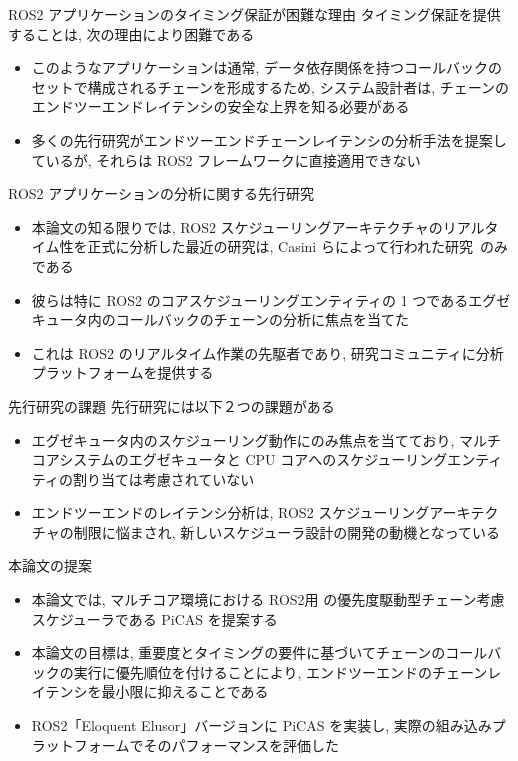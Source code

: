\begin{frame}{ROS2 アプリケーションのタイミング保証が困難な理由}
    タイミング保証を提供することは, 次の理由により困難である
    \begin{itemize}
        \item このようなアプリケーションは通常, データ依存関係を持つコールバックのセットで構成されるチェーンを形成するため, システム設計者は, チェーンのエンドツーエンドレイテンシの安全な上界を知る必要がある
        \item 多くの先行研究がエンドツーエンドチェーンレイテンシの分析手法を提案しているが, それらは ROS2 フレームワークに直接適用できない
    \end{itemize}
\end{frame}

\begin{frame}{ROS2 アプリケーションの分析に関する先行研究}
    \begin{itemize}
        \item 本論文の知る限りでは, ROS2 スケジューリングアーキテクチャのリアルタイム性を正式に分析した最近の研究は, Casini らによって行われた研究~\cite{casini2019response}のみである
        \item 彼らは特に ROS2 のコアスケジューリングエンティティの 1 つであるエグゼキュータ内のコールバックのチェーンの分析に焦点を当てた
        \item これは ROS2 のリアルタイム作業の先駆者であり, 研究コミュニティに分析プラットフォームを提供する
    \end{itemize}
\end{frame}

\begin{frame}{先行研究の課題}
    先行研究には以下２つの課題がある
    \begin{itemize}
        \item エグゼキュータ内のスケジューリング動作にのみ焦点を当てており, マルチコアシステムのエグゼキュータと CPU コアへのスケジューリングエンティティの割り当ては考慮されていない
        \item エンドツーエンドのレイテンシ分析は, ROS2 スケジューリングアーキテクチャの制限に悩まされ, 新しいスケジューラ設計の開発の動機となっている
    \end{itemize}
\end{frame}

\begin{frame}{本論文の提案}
    \begin{itemize}
        \item 本論文では, マルチコア環境における ROS2用 の優先度駆動型チェーン考慮スケジューラである PiCAS を提案する
        \item 本論文の目標は, 重要度とタイミングの要件に基づいてチェーンのコールバックの実行に優先順位を付けることにより, エンドツーエンドのチェーンレイテンシを最小限に抑えることである
        \item ROS2「Eloquent Elusor」バージョンに PiCAS を実装し, 実際の組み込みプラットフォームでそのパフォーマンスを評価した
    \end{itemize}
\end{frame}

